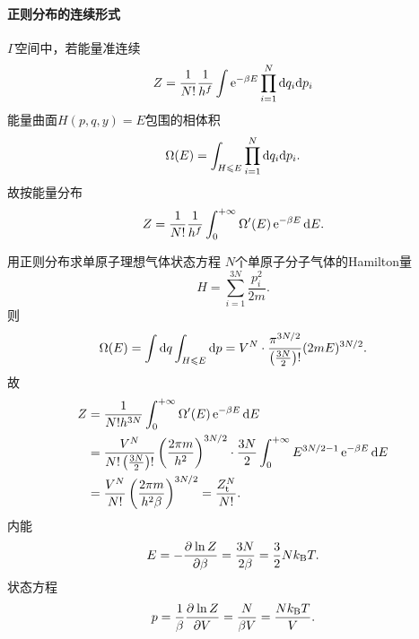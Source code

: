 \paragraph{正则分布的连续形式}$\varGamma$空间中，若能量准连续
\begin{align}
	Z=\frac1{N!}\frac1{h^f}\int\mathop{}\!\mathrm{e}^{-\beta E}\prod_{i=1}^N\mathop{}\!\mathrm{d} q_i\mathrm{d} p_i
\end{align}
能量曲面$H(p,q,y)=E$包围的相体积
\begin{align}
	\Omega(E)=\int_{H\leqslant E}\prod_{i=1}^N\mathop{}\!\mathrm{d} q_i\mathrm{d} p_i.
\end{align}
故按能量分布
\begin{align}
	Z=\frac1{N!}\frac1{h^f}\int_0^{+\infty}\Omega'(E)\mathop{}\!\mathrm{e}^{-\beta E}\mathop{}\!\mathrm{d} E.
\end{align}
\begin{example}{用正则分布求单原子理想气体状态方程}{}
	$N$个单原子分子气体的Hamilton量
	\[
		H=\sum_{i=1}^{3N}\frac{p_i^2}{2m}.
	\]
	则
	\[
		\Omega(E)=\int\mathop{}\!\mathrm{d} q\int_{H\leqslant E}\mathop{}\!\mathrm{d} p=V^N\cdot\frac{\pi^{3N/2}}{\left(\frac{3N}2\right)!}(2mE)^{3N/2}.
	\]
	故
	\begin{align*}
		Z&=\frac1{N!h^{3N}}\int\zti\Omega'(E)\e{-\beta E}\d E\\
		&=\frac{V^N}{N!\kh{\frac{3N}2}!}\kh{\frac{2\pi m}{h^2}}^{3N/2}\cdot\frac{3N}2\int\zti E^{3N/2-1}\e{-\beta E}\d E\\
		&%
		=\frac{V^N}{N!}\kh{\frac{2\pi m}{h^2\beta}}^{3N/2}=\frac{Z_\tl^N}{N!}.
	\end{align*}
	内能
	\begin{align}
		E=-\frac{\partial^{{}}\ln Z}{\partial{\beta}^{{}}}=\frac{3N}{2\beta}=\frac32Nk_{\mathrm B} T.
	\end{align}
	状态方程
	\begin{align}
		p=\frac1\beta\frac{\partial^{{}}\ln Z}{\partial{V}^{{}}}=\frac N{\beta V}=\frac{Nk_{\mathrm B} T}V.
	\end{align}
\end{example}
